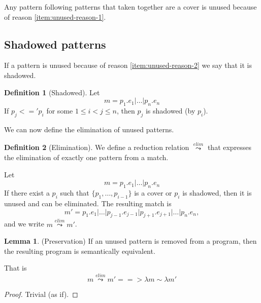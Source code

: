 \documentclass[a4paper, oneside, draft]{memoir}
\theoremstyle{definition}
\newtheorem{definition}{Definition}
\newtheorem{lemma}{Lemma}
\begin{document}
Any pattern following patterns that taken together are a cover is unused because
of reason \ref{item:unused-reason-1}.

\subsection{Shadowed patterns}\label{sec:shadowed-patterns}
If a pattern is unused because of reason \ref{item:unused-reason-2} we say that
it is shadowed.
\begin{definition}[Shadowed]
  Let
  \[
  m = p_1\texttt{.}e_1 \texttt{|} \ldots \texttt{|} p_n\texttt{.}e_n
  \]
  If $p_j <=' p_i$ for some $1 \leq i < j \leq n$, then $p_j$ is shadowed (by
  $p_i$).
\end{definition}

We can now define the elimination of unused patterns.
\begin{definition}[Elimination]
  We define a reduction relation $\stackrel{elim}{\leadsto}$ that expresses the
  elimination of exactly one pattern from a match.

  Let
  \[
  m = p_1\texttt{.}e_1 \texttt{|} \ldots \texttt{|} p_n\texttt{.}e_n
  \]
  If there exist a $p_i$ such that $\{p_1, \ldots, p_{i-1}\}$ is a cover or
  $p_i$ is shadowed, then it is unused and can be eliminated. The resulting
  match is
  \[
  m' = p_1\texttt{.}e_1 \texttt{|} \ldots \texttt{|}
  p_{j-1}\texttt{.}e_{j-1} \texttt{|} p_{j+1}\texttt{.}e_{j+1} \texttt{|}
  \ldots \texttt{|} p_n\texttt{.}e_n,
  \]
  and we write $m \stackrel{elim}{\leadsto} m'$.

\end{definition}


\begin{lemma}(Preservation)
  If an unused pattern is removed from a program, then the resulting program is
  semantically equivalent.

  That is
  \[
  m \stackrel{elim}{\leadsto} m' ==> \lambda m \sim \lambda m'
  \]
\end{lemma}
\begin{proof}
  Trivial (as if).
\end{proof}
\end{document}
